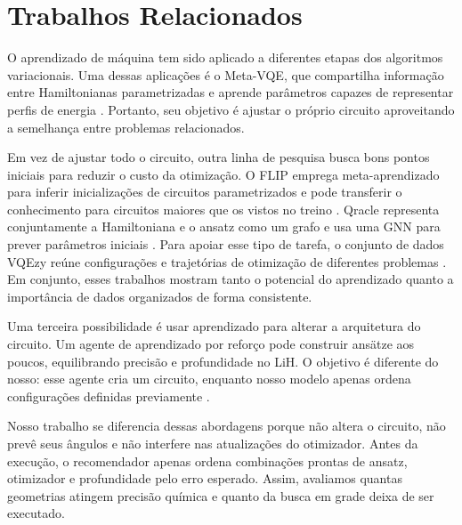 \section{Trabalhos Relacionados}

O aprendizado de máquina tem sido aplicado a diferentes etapas dos algoritmos
variacionais. Uma dessas aplicações é o Meta-VQE, que compartilha informação
entre Hamiltonianas parametrizadas e aprende parâmetros capazes de representar
perfis de energia \cite{cervera2021metavqe}. Portanto, seu objetivo é ajustar o
próprio circuito aproveitando a semelhança entre problemas relacionados.

Em vez de ajustar todo o circuito, outra linha de pesquisa busca bons pontos
iniciais para reduzir o custo da otimização. O FLIP
emprega meta-aprendizado para inferir inicializações de circuitos parametrizados
e pode transferir o conhecimento para circuitos maiores que os vistos no treino
\cite{sauvage2021flip}. Qracle representa conjuntamente a Hamiltoniana e o
ansatz como um grafo e usa uma GNN para prever parâmetros iniciais
\cite{zhang2025qracle}. Para apoiar esse tipo de tarefa, o conjunto de dados
VQEzy reúne configurações e trajetórias de otimização de diferentes problemas
\cite{zhang2025vqezy}. Em conjunto, esses trabalhos mostram tanto o potencial do
aprendizado quanto a importância de dados organizados de forma consistente.

Uma terceira possibilidade é usar aprendizado para alterar a arquitetura do
circuito. Um agente de
aprendizado por reforço pode construir ansätze aos poucos, equilibrando precisão
e profundidade no LiH. O objetivo é diferente do nosso: esse agente cria um
circuito, enquanto nosso modelo apenas ordena configurações definidas
previamente \cite{ostaszewski2021rl}.

Nosso trabalho se diferencia dessas abordagens porque não altera o circuito, não
prevê seus ângulos e não interfere nas atualizações do otimizador. Antes da
execução, o recomendador apenas ordena combinações prontas de ansatz, otimizador
e profundidade pelo erro esperado. Assim, avaliamos quantas geometrias atingem
precisão química e quanto da busca em grade deixa de ser executado.